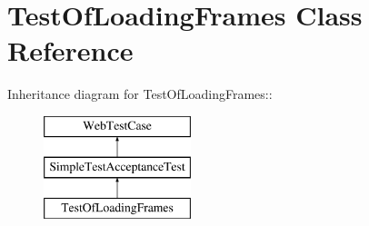 \hypertarget{class_test_of_loading_frames}{
\section{TestOfLoadingFrames Class Reference}
\label{class_test_of_loading_frames}
}
Inheritance diagram for TestOfLoadingFrames::\begin{figure}[H]
\begin{center}
\leavevmode
\includegraphics[height=3cm]{class_test_of_loading_frames}
\end{center}
\end{figure}
